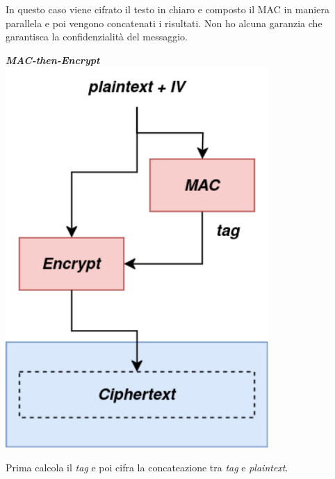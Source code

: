 \begin{flushleft}
{\begin{minipage}[c]{0.30\textwidth}
            In questo caso viene cifrato il testo in chiaro e composto il MAC in maniera parallela e poi vengono concatenati i risultati. Non ho alcuna garanzia che garantisca la confidenzialità del messaggio.

        \end{minipage}
        \begin{minipage}[c]{0.30\textwidth}
            \centering
            \textbf{\textit{MAC-then-Encrypt}} \\
            \includegraphics[width=0.75\textwidth]{img/mac_then_enc.png}

            Prima calcola il \textit{tag} e poi cifra la concateazione tra \textit{tag} e \textit{plaintext}.


\end{minipage}}
\end{flushleft}
